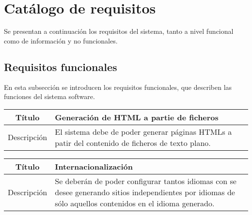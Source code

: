 
\section{Catálogo de requisitos}

Se presentan a continuación los requisitos del sistema, tanto a nivel funcional
como de información y no funcionales.

\subsection{Requisitos funcionales}

En esta subsección se introducen los requisitos funcionales, que describen las funciones
del sistema software.

\begin{center}

    \begin{tabularx}{\textwidth}{|c|X|}
        \hline
        Título & Generación de HTML a partie de ficheros\\

        \hline

        Descripción & El sistema debe de poder generar páginas HTMLs a patir
        del contenido de ficheros de texto plano.\\

        \hline
    \end{tabularx}
\end{center}

\begin{center}

    \begin{tabularx}{\textwidth}{|c|X|}
        \hline
        Título & Internacionalización\\

        \hline

        Descripción & Se deberán de poder configurar tantos idiomas con se desee
        generando sitios independientes por idiomas de sólo aquellos contenidos
        en el idioma generado.\\

        \hline
    \end{tabularx}
\end{center}

